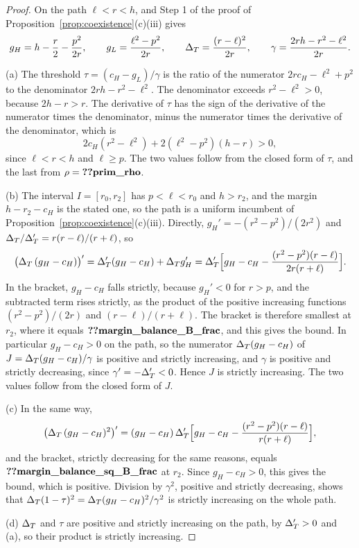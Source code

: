 \begin{proof}
On the path \(\ell<r<h\), and Step 1 of the proof of Proposition~\ref{prop:coexistence}(c)(iii) gives
\[
g_H=h-\frac r2-\frac{p^2}{2r},\qquad g_L=\frac{\ell^2-p^2}{2r},\qquad \Delta_T=\frac{(r-\ell)^2}{2r},\qquad
\gamma=\frac{2rh-r^2-\ell^2}{2r}.
\]

(a) The threshold \(\tau=(c_H-g_L)/\gamma\) is the ratio of the numerator \(2rc_H-\ell^2+p^2\) to the denominator
\(2rh-r^2-\ell^2\). The denominator exceeds \(r^2-\ell^2>0\), because \(2h-r>r\). The derivative of \(\tau\) has the sign
of the derivative of the numerator times the denominator, minus the numerator times the derivative of the
denominator, which is
\[
2c_H(r^2-\ell^2)+2(\ell^2-p^2)(h-r)>0 ,
\]
since \(\ell<r<h\) and \(\ell\ge p\). The two values follow from the closed form of \(\tau\), and the last from
\(\rho=\reg{prim_rho}\).

(b) The interval \(I=[r_0,r_2]\) has \(p<\ell<r_0\) and \(h>r_2\), and the margin \(h-r_2-c_H\) is the stated one, so
the path is a uniform incumbent of Proposition~\ref{prop:coexistence}(c)(iii). Directly, \(g_H'=-(r^2-p^2)/(2r^2)\) and
\(\Delta_T/\Delta_T'=r(r-\ell)/(r+\ell)\), so
\[
\bigl(\Delta_T\,(g_H-c_H)\bigr)'=\Delta_T'(g_H-c_H)+\Delta_T g_H'
=\Delta_T'\Bigl[g_H-c_H-\frac{(r^2-p^2)(r-\ell)}{2r(r+\ell)}\Bigr].
\]
In the bracket, \(g_H-c_H\) falls strictly, because \(g_H'<0\) for \(r>p\), and the subtracted term rises strictly, as
the product of the positive increasing functions \((r^2-p^2)/(2r)\) and \((r-\ell)/(r+\ell)\). The bracket is
therefore smallest at \(r_2\), where it equals \(\reg{margin_balance_B_frac}\), and this gives the bound. In
particular \(g_H-c_H>0\) on the path, so the numerator \(\Delta_T(g_H-c_H)\) of \(J=\Delta_T(g_H-c_H)/\gamma\) is positive and
strictly increasing, and \(\gamma\) is positive and strictly decreasing, since \(\gamma'=-\Delta_T'<0\). Hence \(J\) is
strictly increasing. The two values follow from the closed form of \(J\).

(c) In the same way,
\[
\bigl(\Delta_T\,(g_H-c_H)^2\bigr)'=(g_H-c_H)\,\Delta_T'\Bigl[g_H-c_H-\frac{(r^2-p^2)(r-\ell)}{r(r+\ell)}\Bigr],
\]
and the bracket, strictly decreasing for the same reasons, equals \(\reg{margin_balance_sq_B_frac}\) at \(r_2\). Since
\(g_H-c_H>0\), this gives the bound, which is positive. Division by \(\gamma^2\), positive and strictly decreasing,
shows that \(\Delta_T(1-\tau)^2=\Delta_T(g_H-c_H)^2/\gamma^2\) is strictly increasing on the whole path.

(d) \(\Delta_T\) and \(\tau\) are positive and strictly increasing on the path, by \(\Delta_T'>0\) and (a), so their product is
strictly increasing.
\end{proof}

